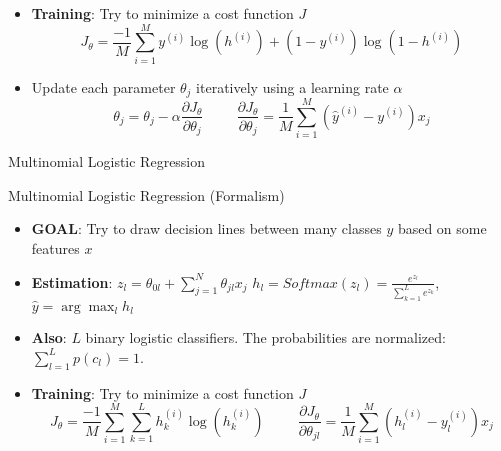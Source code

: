 \documentclass{KBook}
\begin{document}
	\begin{itemize}
		\item \textbf{Training}: Try to minimize a cost function $ J $
		\[J_\theta = \frac{-1}{M} \sum\limits_{i=1}^{M} y^{(i)} \log(h^{(i)}) + (1- y^{(i)}) \log(1 - h^{(i)})\]
		\item Update each parameter $ \theta_j $ iteratively using a learning rate $ \alpha $
		\[\theta_j = \theta_j - \alpha \frac{\partial J_\theta}{\partial \theta_j}
		\hspace{1cm}
		\frac{\partial J_\theta}{\partial \theta_j} = \frac{1}{M} \sum\limits_{i=1}^{M} (\hat{y}^{(i)} - y^{(i)}) x_j
		\]
	\end{itemize}
	
	Multinomial Logistic Regression
	
	\begin{minipage}{0.6\textwidth} 
	\end{minipage}
	\begin{minipage}{0.39\textwidth} 
	\end{minipage}
	
	Multinomial Logistic Regression (Formalism)
	
	\begin{minipage}{0.7\textwidth} 
		\begin{itemize}
			\item \textbf{GOAL}: Try to draw decision lines between many classes $ y $ based on some features $ x $
			\item \textbf{Estimation}: $ z_l = \theta_{0l} + \sum_{j=1}^{N} \theta_{jl} x_j $
			$ h_l = Softmax(z_l) = \frac{e^{z_l}}{\sum_{k=1}^{L} e^{z_k}}$, $ \hat{y} = \arg\max_{l} h_l$
			\item \textbf{Also}: $ L $ binary logistic classifiers. 
			The probabilities are normalized: $ \sum_{l=1}^{L} p(c_l) = 1$.
		\end{itemize}
	\end{minipage}
	\begin{minipage}{0.29\textwidth} 
	\end{minipage}
	
	\begin{itemize}
		\item \textbf{Training}: Try to minimize a cost function $ J $
		\[J_\theta = \frac{-1}{M} \sum\limits_{i=1}^{M} \sum_{k=1}^{L} h^{(i)}_k \log(h^{(i)}_k)
		\hspace{1cm}
		\frac{\partial J_\theta}{\partial \theta_{jl}} = \frac{1}{M} \sum\limits_{i=1}^{M} (h_l^{(i)} - y_l^{(i)}) x_j
		\]
	\end{itemize}
	
\end{document}
